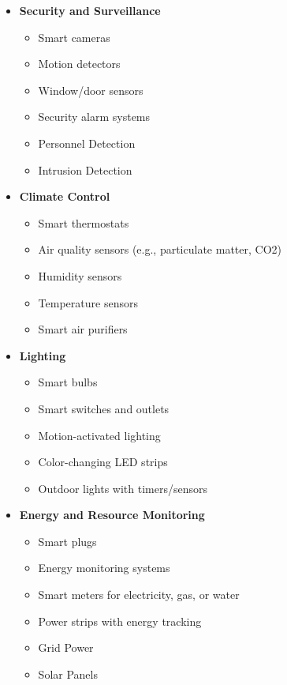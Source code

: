 \documentclass[journal]{IEEEtran} %
\begin{document}
\begin{itemize}[]  %
    \item{\textbf{Security and Surveillance}}
        \begin{itemize}
            \item Smart cameras
            \item Motion detectors
            \item Window/door sensors
            \item Security alarm systems
            \item Personnel Detection
            \item Intrusion Detection
        \end{itemize}

    \item{\textbf{Climate Control}}
        \begin{itemize}
            \item Smart thermostats
            \item Air quality sensors (e.g., particulate matter, CO2)
            \item Humidity sensors
            \item Temperature sensors
            \item Smart air purifiers
        \end{itemize}

    \item{\textbf{Lighting}}
        \begin{itemize}
            \item Smart bulbs
            \item Smart switches and outlets
            \item Motion-activated lighting
            \item Color-changing LED strips
            \item Outdoor lights with timers/sensors
        \end{itemize}

    \item{\textbf{Energy and Resource Monitoring}}
        \begin{itemize}
            \item Smart plugs
            \item Energy monitoring systems
            \item Smart meters for electricity, gas, or water
            \item Power strips with energy tracking
            \item Grid Power
            \item Solar Panels
        \end{itemize}


\end{itemize}
\end{document}
